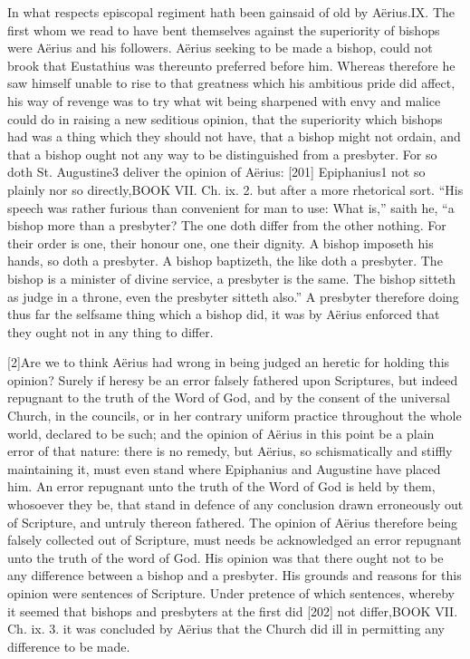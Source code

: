 In what respects episcopal regiment hath been gainsaid of old by Aërius.IX. The first whom we read to have bent themselves against the superiority of bishops were Aërius and his followers. Aërius seeking to be made a bishop, could not brook that Eustathius was thereunto preferred before him. Whereas therefore he saw himself unable to rise to that greatness which his ambitious pride did affect, his way of revenge was to try what wit being sharpened with envy and malice could do in raising a new seditious opinion, that the superiority which bishops had was a thing which they should not have, that a bishop might not ordain, and that a bishop ought not any way to be distinguished from a presbyter. For so doth St. Augustine3 deliver the opinion of Aërius: [201] Epiphanius1 not so plainly nor so directly,BOOK VII. Ch. ix. 2. but after a more rhetorical sort. “His speech was rather furious than convenient for man to use: What is,” saith he, “a bishop more than a presbyter? The one doth differ from the other nothing. For their order is one, their honour one, one their dignity. A bishop imposeth his hands, so doth a presbyter. A bishop baptizeth, the like doth a presbyter. The bishop is a minister of divine service, a presbyter is the same. The bishop sitteth as judge in a throne, even the presbyter sitteth also.” A presbyter therefore doing thus far the selfsame thing which a bishop did, it was by Aërius enforced that they ought not in any thing to differ.

[2]Are we to think Aërius had wrong in being judged an heretic for holding this opinion? Surely if heresy be an error falsely fathered upon Scriptures, but indeed repugnant to the truth of the Word of God, and by the consent of the universal Church, in the councils, or in her contrary uniform practice throughout the whole world, declared to be such; and the opinion of Aërius in this point be a plain error of that nature: there is no remedy, but Aërius, so schismatically and stiffly maintaining it, must even stand where Epiphanius and Augustine have placed him. An error repugnant unto the truth of the Word of God is held by them, whosoever they be, that stand in defence of any conclusion drawn erroneously out of Scripture, and untruly thereon fathered. The opinion of Aërius therefore being falsely collected out of Scripture, must needs be acknowledged an error repugnant unto the truth of the word of God. His opinion was that there ought not to be any difference between a bishop and a presbyter. His grounds and reasons for this opinion were sentences of Scripture. Under pretence of which sentences, whereby it seemed that bishops and presbyters at the first did [202] not differ,BOOK VII. Ch. ix. 3. it was concluded by Aërius that the Church did ill in permitting any difference to be made.

